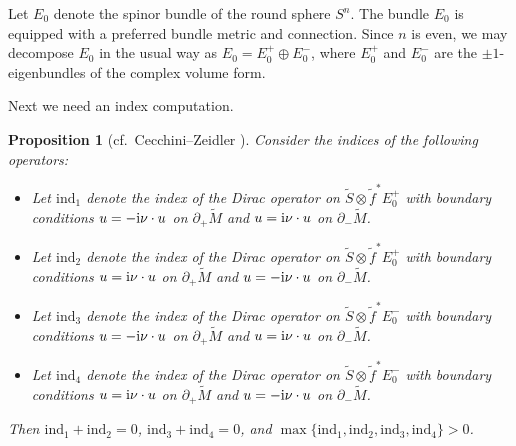 \documentclass[11pt]{article}
\numberwithin{equation}{section}
\numberwithin{equation}{section}
\newtheorem{Proposition}[Theorem]{Proposition}
 { \theoremstyle{definition}
\newtheorem{Definition}[Theorem]{Definition}
\newtheorem{Note}[Theorem]{Note}
\newtheorem{Example}[Theorem]{Example}
\newtheorem{Remark}[Theorem]{Remark} }
\begin{document}
Let $E_0$ denote the spinor bundle of the round sphere $S^n$.
The bundle $E_0$ is equipped with a preferred bundle metric and connection.
Since $n$ is even, we may decompose $E_0$ in the usual way as $E_0 = E_0^+ \oplus E_0^-$, where $E_0^+$ and $E_0^-$ are the $\pm 1$-eigenbundles of the complex volume form.

Next we need an index computation.

\begin{Proposition}[cf.\ Cecchini--Zeidler \cite{Cecchini-Zeidler}]
\label{index_even_dim}
Consider the indices of the following operators:
\begin{itemize}\itemsep=0pt
\item Let $\mathrm{ind}_1$ denote the index of the Dirac operator on $\tilde{S} \otimes \tilde{f}^* E_0^+$ with boundary conditions $u = -{\rm i} \nu \cdot u$ on $\partial_+ \tilde{M}$ and $u = {\rm i} \nu \cdot u$ on $\partial_- \tilde{M}$.
\item Let $\mathrm{ind}_2$ denote the index of the Dirac operator on $\tilde{S} \otimes \tilde{f}^* E_0^+$ with boundary conditions $u = {\rm i} \nu \cdot u$ on $\partial_+ \tilde{M}$ and $u = -{\rm i} \nu \cdot u$ on $\partial_- \tilde{M}$.
\item Let $\mathrm{ind}_3$ denote the index of the Dirac operator on $\tilde{S} \otimes \tilde{f}^* E_0^-$ with boundary conditions $u = -{\rm i} \nu \cdot u$ on $\partial_+ \tilde{M}$ and $u = {\rm i} \nu \cdot u$ on $\partial_- \tilde{M}$.
\item Let $\mathrm{ind}_4$ denote the index of the Dirac operator on $\tilde{S} \otimes \tilde{f}^* E_0^-$ with boundary conditions $u = {\rm i} \nu \cdot u$ on $\partial_+ \tilde{M}$ and $u = -{\rm i} \nu \cdot u$ on $\partial_- \tilde{M}$.
\end{itemize}
Then $\mathrm{ind}_1+\mathrm{ind}_2 = 0$, $\mathrm{ind}_3+\mathrm{ind}_4 = 0$, and $\max \{\mathrm{ind}_1,\mathrm{ind}_2, \mathrm{ind}_3, \mathrm{ind}_4\} > 0$.
\end{Proposition}
\end{document}
